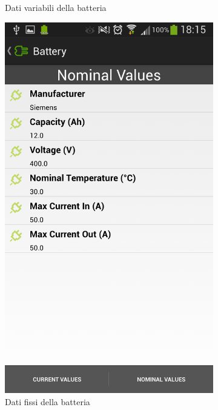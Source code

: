 \begin{figure}
\begin{subfigure}{0.45\textwidth}
		\caption{Dati variabili della batteria}
		\label{fig:battery-var}
	\end{subfigure}
	\begin{subfigure}{0.45\textwidth}
		\includegraphics[width=\textwidth]{assets/mobile-app-battery-nom.png}
		\caption{Dati fissi della batteria}
		\label{fig:battery-nom}
    \end{subfigure}
    \begin{subfigure}{0.45\textwidth}

\end{subfigure}
\end{figure}
